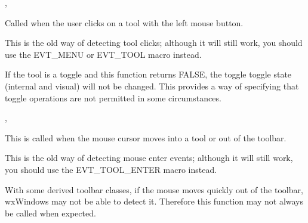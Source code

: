 
, 

\label{wxtoolbaronleftclick}


Called when the user clicks on a tool with the left mouse button.

This is the old way of detecting tool clicks; although it will still work,
you should use the EVT\_MENU or EVT\_TOOL macro instead.





If the tool is a toggle and this function returns FALSE, the toggle
toggle state (internal and visual) will not be changed. This provides a way of
specifying that toggle operations are not permitted in some circumstances.


,\rtfsp
{}

\label{wxtoolbaronmouseenter}


This is called when the mouse cursor moves into a tool or out of
the toolbar.

This is the old way of detecting mouse enter events; although it will still work,
you should use the EVT\_TOOL\_ENTER macro instead.




With some derived toolbar classes, if the mouse moves quickly out of the toolbar, wxWindows may not be able to
detect it. Therefore this function may not always be called when expected.

